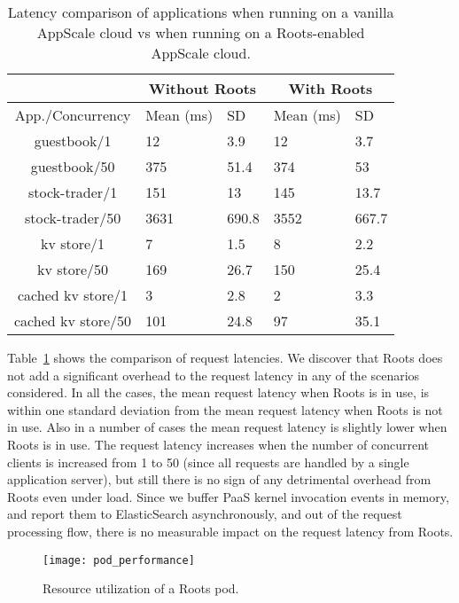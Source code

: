\begin{table}
\begin{center}
\begin{tabular}{|c|p{0.8cm}|p{0.8cm}|p{0.8cm}|p{0.8cm}|}
\hline &
      \multicolumn{2}{c|}{Without Roots} &
      \multicolumn{2}{c|}{With Roots} \\ \hline
    App./Concurrency & Mean (ms) & SD & Mean (ms) & SD\\

\hline
guestbook/1 & 12 & 3.9 & 12 & 3.7 \\ \hline
guestbook/50 & 375 & 51.4 & 374 & 53 \\ \hline
stock-trader/1 & 151 & 13 & 145 & 13.7 \\ \hline
stock-trader/50 & 3631 & 690.8 & 3552 & 667.7 \\ \hline
kv store/1 & 7 & 1.5 & 8 & 2.2 \\ \hline
kv store/50 & 169 & 26.7  & 150 & 25.4  \\ \hline
cached kv store/1 & 3 & 2.8 & 2 & 3.3 \\ \hline
cached kv store/50 & 101 & 24.8 & 97 & 35.1  \\ \hline
\end{tabular}
\end{center}
\caption{Latency comparison of applications when running on
a vanilla AppScale cloud vs when running on a Roots-enabled
AppScale cloud.
\label{tab:perf_overhead}
}
\end{table}

Table~\ref{tab:perf_overhead} shows the comparison of request 
latencies. We discover that Roots does not add a significant overhead
to the request latency in any of the scenarios considered. In all the cases,
the mean request latency when Roots is in use, is within one standard deviation
from the mean request latency when Roots is not in use. Also in a number
of cases the mean request latency is slightly lower when Roots is in use.
The request latency increases when the number of concurrent clients is
increased from 1 to 50 (since all requests are handled by a single
application server), but still there is no sign of any detrimental overhead
from Roots even under load. Since we buffer PaaS kernel invocation
events in memory, and report them to ElasticSearch asynchronously, and
out of the request processing flow, there is no measurable impact on
the request latency from Roots.

\begin{figure}
\centering
\texttt{[image: pod\_performance]}
\caption{Resource utilization of a Roots pod.}
\label{fig:pod_performance}
\end{figure}

